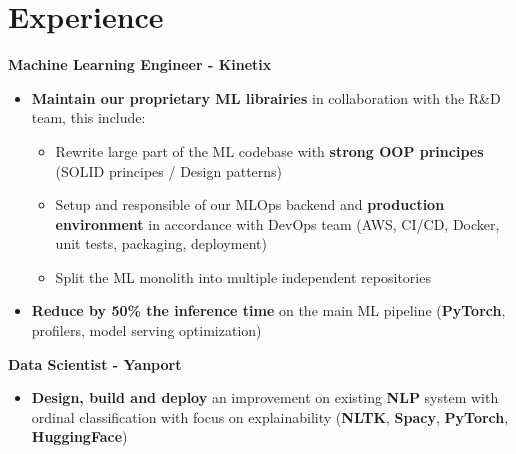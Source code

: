 \documentclass[a4paper,10pt]{article}
\begin{document}
\begin{adjustbox}{valign=t}
    \begin{minipage}{0.6\textwidth}
        \vspace{1cm}
        \section*{Experience}
        \vspace{-.3cm}
        \begin{description}
            \raggedright
            \item[\normalfont \textcolor{ColorOne}{Since Oct. 2022}]
                \textbf{Machine Learning Engineer - Kinetix}\\
                \small
                \begin{itemize}[topsep=0pt]
                    \item \textbf{Maintain our proprietary ML librairies} in collaboration with the R\&D team, this include:
                    \begin{itemize}[topsep=0pt]
                        \item Rewrite large part of the ML codebase with \textbf{strong OOP principes} (SOLID principes / Design patterns)
                        \item Setup and responsible of our MLOps backend and \textbf{production environment} in accordance with DevOps team (AWS, CI/CD, Docker, unit tests, packaging, deployment)
                        \item Split the ML monolith into multiple independent repositories
                    \end{itemize}
                    \item \textbf{Reduce by 50\% the inference time} on the main ML pipeline (\textbf{PyTorch}, profilers, model serving optimization)
                \end{itemize}
                \normalsize
            \item[\normalfont \textcolor{ColorOne}{Sep. 2021 -- Sep. 2022}]
                \textbf{Data Scientist - Yanport}\\
                \small
                \begin{itemize}[topsep=0pt]
                    \item \textbf{Design, build and deploy} an improvement on existing \textbf{NLP} system with ordinal classification with focus on explainability (\textbf{NLTK}, \textbf{Spacy}, \textbf{PyTorch}, \textbf{HuggingFace})

\end{itemize}
\end{description}
\end{minipage}
\end{adjustbox}
\end{document}
